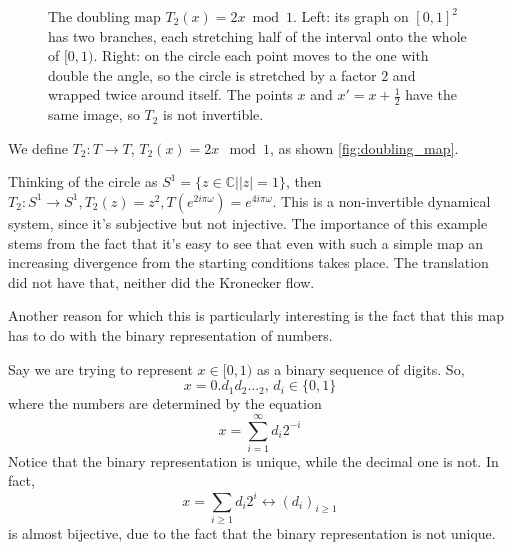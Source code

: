 \begin{example}[of map]
\begin{figure}[ht]
        \caption{The doubling map $T_2(x)=2x \bmod 1$. Left: its graph on $[0,1]^2$ has two branches,
        each stretching half of the interval onto the whole of $[0,1)$. Right: on the circle each point
        moves to the one with double the angle, so the circle is stretched by a factor $2$ and wrapped
        twice around itself. The points $x$ and $x'=x+\frac12$ have the same image, so $T_2$ is not invertible.}
        \label{fig:doubling_map}
    \end{figure}
    We define $T_2: T\rightarrow T$, $T_2(x)=2x \mod 1$, as shown \autoref{fig:doubling_map}.
    
    Thinking of the circle as $S^1=\{z\in\mathbb{C}| |z|=1\}$, then $T_2:S^1\rightarrow S^1, T_2(z)=z^2, T(e^{2i\pi\omega})=e^{4i\pi \omega}$. This is a non-invertible dynamical system, since it's subjective but not injective. The importance of this example stems from the fact that it's easy to see that even with such a simple map an increasing divergence from the starting conditions takes place. The translation did not have that, neither did the Kronecker flow. 
    
    Another reason for which this is particularly interesting is the fact that this map has to do with the binary representation of numbers.
    
    Say we are trying to represent $x\in[0,1)$ as a binary sequence of digits. So, \begin{equation}
    x=0.d_1d_2..._2,\, d_i\in\{0,1\}
    \label{eq:binary}
    \end{equation}
    where the numbers are determined by the equation
    \begin{equation}
        x=\sum_{i=1}^{\infty}d_i2^{-i}
    \label{eq:decimal}
    \end{equation}
    Notice that the binary representation is unique, while the decimal one is not. In fact, \begin{equation*}
    x=\sum_{i\geq 1}d_i2^i\leftrightarrow (d_i)_{i\geq1}
    \end{equation*}
    is almost bijective, due to the fact that the binary representation is not unique.
    

\end{example}
